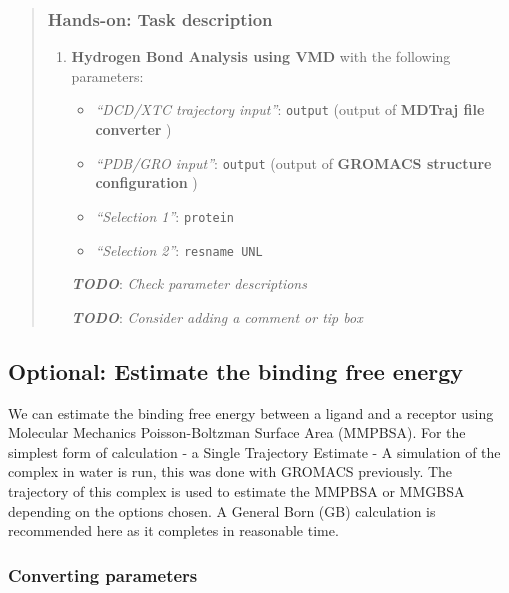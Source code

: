 \documentclass[twocolumn]{bmcart}%
\providecommand{\tightlist}{%
  \setlength{\itemsep}{0pt}\setlength{\parskip}{0pt}}
\providecommand{\tightlist}{%
  \setlength{\itemsep}{0pt}\setlength{\parskip}{0pt}}
\begin{document}
\begin{quote}
\hypertarget{hands-on-task-description-16}{%
\subsubsection{Hands-on: Task
description}\label{hands-on-task-description-16}}

\begin{enumerate}
\def\labelenumi{\arabic{enumi}.}
\tightlist
\item
  \textbf{Hydrogen Bond Analysis using VMD} with the following
  parameters:

  \begin{itemize}
  \tightlist
  \item
    \emph{``DCD/XTC trajectory input''}: \texttt{output} (output of
    \textbf{MDTraj file converter} )
  \item
    \emph{``PDB/GRO input''}: \texttt{output} (output of \textbf{GROMACS
    structure configuration} )
  \item
    \emph{``Selection 1''}: \texttt{protein}
  \item
    \emph{``Selection 2''}: \texttt{resname\ UNL}
  \end{itemize}

  \textbf{\emph{TODO}}: \emph{Check parameter descriptions}

  \textbf{\emph{TODO}}: \emph{Consider adding a comment or tip box}
\end{enumerate}


\end{quote}


\hypertarget{optional-estimate-the-binding-free-energy}{%
\subsection{Optional: Estimate the binding free
energy}\label{optional-estimate-the-binding-free-energy}}

We can estimate the binding free energy between a ligand and a receptor
using Molecular Mechanics Poisson-Boltzman Surface Area (MMPBSA). For
the simplest form of calculation - a Single Trajectory Estimate - A
simulation of the complex in water is run, this was done with GROMACS
previously. The trajectory of this complex is used to estimate the
MMPBSA or MMGBSA depending on the options chosen. A General Born (GB)
calculation is recommended here as it completes in reasonable time.

\hypertarget{converting-parameters}{%
\subsubsection{Converting parameters}\label{converting-parameters}}
\end{document}
